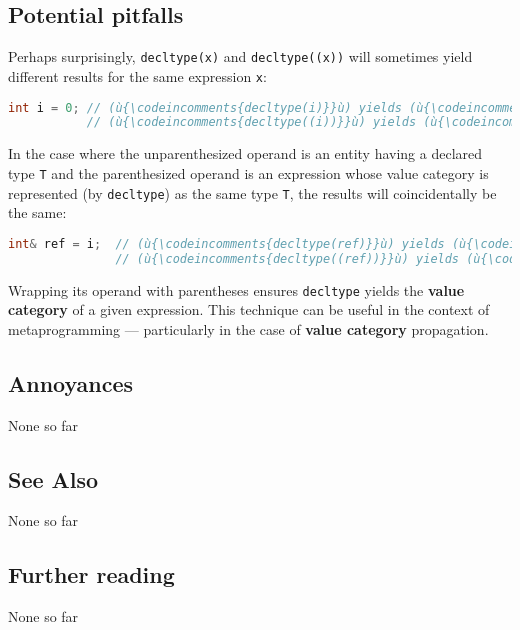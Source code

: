 \subsection[Potential pitfalls]{Potential pitfalls}\label{potential-pitfalls}

Perhaps surprisingly, \texttt{decltype(x)} and \texttt{decltype((x))}
will sometimes yield different results for the same expression
\texttt{x}:

\begin{lstlisting}[language=C++]
int i = 0; // (ù{\codeincomments{decltype(i)}}ù) yields (ù{\codeincomments{int}}ù).
           // (ù{\codeincomments{decltype((i))}}ù) yields (ù{\codeincomments{int\&}}ù).
\end{lstlisting}
    
\noindent In the case where the unparenthesized operand is an entity having a
declared type \texttt{T} and the parenthesized operand is an expression
whose value category is represented (by \texttt{decltype}) as the same
type \texttt{T}, the results will coincidentally be the same:

\begin{lstlisting}[language=C++]
int& ref = i;  // (ù{\codeincomments{decltype(ref)}}ù) yields (ù{\codeincomments{int\&}}ù).
               // (ù{\codeincomments{decltype((ref))}}ù) yields (ù{\codeincomments{int\&}}ù).
\end{lstlisting}
    
\noindent Wrapping its operand with parentheses ensures \texttt{decltype} yields
the \textbf{value category} of a given expression. This technique can be
useful in the context of metaprogramming --- particularly in the case of
\textbf{value category} propagation.

\subsection[Annoyances]{Annoyances}\label{annoyances}

None so far

\subsection[See Also]{See Also}\label{see-also}

None so far

\subsection[Further reading]{Further reading}\label{further-reading}

None so far


